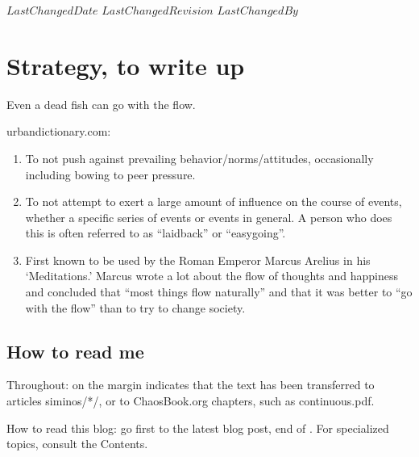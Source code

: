 \ifsvnmulti
 {$LastChangedDate$}
 {$LastChangedRevision$} {$LastChangedBy$}
\fi

\chapter{Strategy, to write up}

\begin{bartlett}{
Even a dead fish can go with the flow.}
\end{bartlett}


{urbandictionary.com}:

\begin{enumerate}
   \item To not push against prevailing behavior/norms/attitudes,
   occasionally including bowing to peer pressure.

   \item To not attempt to exert a large amount of influence on the
   course of events, whether a specific series of events or events in
   general. A person who does this is often referred to as ``laidback''
   or ``easygoing''.

   \item First known to be used by the Roman Emperor Marcus Arelius in
   his `Meditations.' Marcus wrote a lot about the flow of
   thoughts and happiness and concluded that ``most things flow
   naturally'' and that it was better to ``go with the flow''
   than to try to change society.
 \end{enumerate}

\section{How to read me}

Throughout:  {\textdollar} on the margin
{\steady}
indicates that the text has been transferred to
articles siminos/*/,  or to ChaosBook.org
chapters, such as
{continuous.pdf}.

How to read this blog: go first to the latest blog post, end
of . For specialized topics, consult the
Contents.


